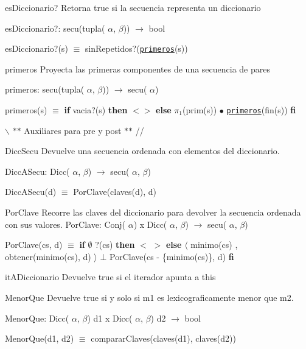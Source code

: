 \begin{DoxyParagraph}{es\-Diccionario?}
\-Retorna true si la secuencia representa un diccionario
\end{DoxyParagraph}
es\-Diccionario?\-: secu(tupla( $\alpha$, $\beta$)) $\to$ bool\par
 es\-Diccionario?(s) $\equiv$ sin\-Repetidos?(\href{axiomas.html#primeros}{\tt primeros}(s)) 

\begin{DoxyParagraph}{primeros}
\-Proyecta las primeras componentes de una secuencia de pares
\end{DoxyParagraph}
primeros\-: secu(tupla( $\alpha$, $\beta$)) $\to$ secu( $\alpha$)\par
 primeros(s) $\equiv$ {\bfseries if} vacia?(s) {\bfseries then} $<$$>$ {\bfseries else} $\pi_1$(prim(s)) $\bullet$ \href{axiomas.html#primeros}{\tt primeros}(fin(s)) {\bfseries fi} 

$\backslash$ $\ast$$\ast$ \-Auxiliares para pre y post $\ast$$\ast$ // \begin{DoxyParagraph}{\-Dicc\-Secu}
\-Devuelve una secuencia ordenada con elementos del diccionario.
\end{DoxyParagraph}
\-Dicc\-A\-Secu\-: \-Dicc( $\alpha$, $\beta$) $\to$ secu( $\alpha$, $\beta$)\par
 \-Dicc\-A\-Secu(d) $\equiv$ \-Por\-Clave(claves(d), d) 

\begin{DoxyParagraph}{\-Por\-Clave}
\-Recorre las claves del diccionario para devolver la secuencia ordenada con sus valores. \-Por\-Clave\-: \-Conj( $\alpha$) x \-Dicc( $\alpha$, $\beta$) $\to$ secu( $\alpha$, $\beta$)\par
 \-Por\-Clave(cs, d) $\equiv$ {\bfseries if} $\emptyset$ ?(cs) {\bfseries then} $<$ $>$ {\bfseries else} $\langle$ minimo(cs) , obtener(minimo(cs), d) $\rangle$ $\bot$ \-Por\-Clave(cs -\/ \{minimo(cs)\}, d) {\bfseries fi} 
\end{DoxyParagraph}
\begin{DoxyParagraph}{it\-A\-Diccionario}
\-Devuelve true si el iterador apunta a this
\end{DoxyParagraph}


\begin{DoxyParagraph}{\-Menor\-Que}
\-Devuelve true si y solo si m1 es lexicograficamente menor que m2.
\end{DoxyParagraph}
\-Menor\-Que\-: \-Dicc( $\alpha$, $\beta$) d1 x \-Dicc( $\alpha$, $\beta$) d2 $\to$ bool\par
 \-Menor\-Que(d1, d2) $\equiv$ comparar\-Claves(claves(d1), claves(d2)) 

